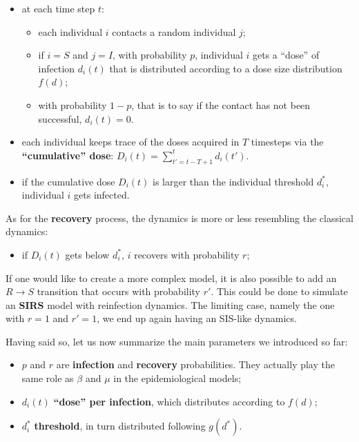 \documentclass[../main/main.tex]{subfiles}
\begin{document}
\begin{itemize}
\item at each time step \( t \):
        \begin{itemize}
        \item each individual $i$ contacts a random individual $j$;
        \item if $i = S$ and $j = I$, with probability $p$, individual $i$ gets a “dose” of infection $d_i(t)$ that is distributed according to a dose size distribution $f(d)$;
        \item with probability $1-p$, that is to say if the contact has not been successful, $d_i(t)=0$.
        \end{itemize}
\item each individual keeps trace of the doses acquired in $T$ timesteps via the \textbf{“cumulative” dose}: $D_i(t) = \sum_{t'=t-T+1}^{t} d_i(t')$.

\item if the cumulative dose $D_i(t)$ is larger than the individual threshold $d_i^*$, individual $i$ gets infected.
\end{itemize}

As for the \textbf{recovery} process, the dynamics is more or less resembling the classical dynamics:
\begin{itemize}
\item if $D_i(t)$ gets below $d_i^*$, $i$ recovers with probability $r$;
\end{itemize}

If one would like to create a more complex model, it is also possible to add an $R \rightarrow S$ transition that occurs with probability $r'$. This could be done to simulate an \textbf{SIRS} model with reinfection dynamics. The limiting case, namely the one with $r = 1$ and $r' = 1$, we end up again having an SIS-like dynamics.


Having said so, let us now summarize the main parameters we introduced so far:
\begin{itemize}
\item \( p \) and \( r \) are \textbf{infection} and \textbf{recovery} probabilities. They actually play the same role as \( \beta  \) and \( \mu  \) in the epidemiological models;
\item $d_i(t)$ \textbf{“dose” per infection}, which distributes according to $f(d)$;
\item \( d_i^* \) \textbf{threshold}, in turn distributed following \( g(d^*) \).
\end{itemize}
\end{document}
